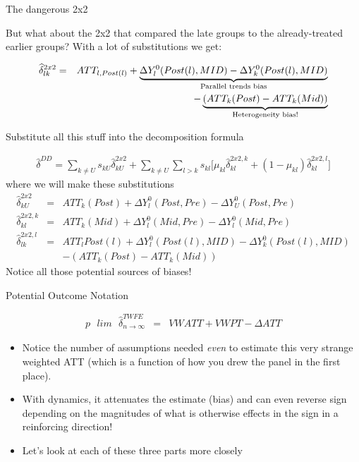 \documentclass{beamer}
\begin{document}
\begin{frame}{The dangerous 2x2}

But what about the 2x2 that compared the late groups to the already-treated earlier groups? With a lot of substitutions we get:

\begin{eqnarray*}
\widehat{\delta}^{2x2}_{lk} &=& ATT_{l,Post(l)} + \underbrace{\Delta Y^0_l(Post(l),MID) - \Delta Y^0_k ( Post(l), MID)}_{\mathclap{\text{Parallel trends bias}}} \\
&& - \underbrace{(ATT_k(Post) - ATT_k(Mid))}_{\mathclap{\text{Heterogeneity bias!}}}
\end{eqnarray*}


\end{frame}

\begin{frame}{Substitute all this stuff into the decomposition formula}

\begin{eqnarray*}	
\widehat{\delta}^{DD} = \sum_{k \neq U} s_{kU}\widehat{\delta}_{kU}^{2x2} + \sum_{k \neq U} \sum_{l>k} s_{kl}  \bigg [ \mu_{kl}\widehat{\delta}_{kl}^{2x2,k} + (1-\mu_{kl}) \widehat{\delta}_{kl}^{2x2,l} \bigg]
\end{eqnarray*}where we will make these substitutions\begin{eqnarray*}
\widehat{\delta}_{kU}^{2x2} &=& ATT_k(Post) + \Delta Y_l^0(Post,Pre) - \Delta Y_U^0(Post, Pre) \\
\widehat{\delta}_{kl}^{2x2,k} &=& ATT_k(Mid) + \Delta Y_l^0(Mid,Pre) - \Delta Y_l^0(Mid, Pre) \\
\widehat{\delta}^{2x2,l}_{lk} &=& ATT_{l}Post(l) + \Delta Y^0_l(Post(l),MID) - \Delta Y^0_k ( Post(l), MID) \\
&&- (ATT_k(Post) - ATT_k(Mid))
\end{eqnarray*}Notice all those potential sources of biases! 

\end{frame}


\begin{frame}{Potential Outcome Notation}

\begin{eqnarray*}
p\text{ }lim\text{ } \widehat{\delta}^{TWFE}_{n\to\infty} &=& VWATT + VWPT - \Delta ATT
\end{eqnarray*}

\begin{itemize}
\item Notice the number of assumptions needed \emph{even} to estimate this very strange weighted ATT (which is a function of how you drew the panel in the first place). 
\item With dynamics, it attenuates the estimate (bias) and can even reverse sign depending on the magnitudes of what is otherwise effects in the sign in a reinforcing direction! 
\item Let's look at each of these three parts more closely
\end{itemize}

\end{frame}
\end{document}
